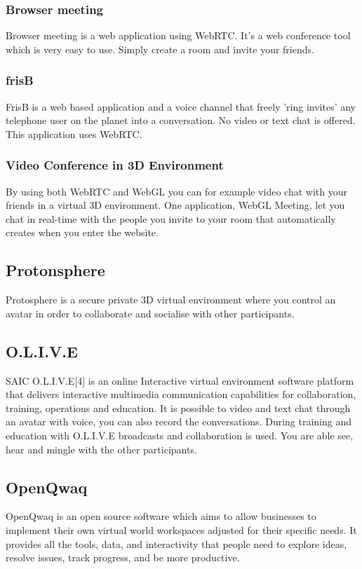 \documentclass[12pt, titlepage]{article}
\begin{document}
\subsubsection{Browser meeting}
Browser meeting\cite{12} is a web application using WebRTC. It's a web conference tool which is very easy to use. Simply create a room and invite your friends.
\subsubsection{frisB}
FrisB\cite{15} is a web based application and a voice channel that freely 'ring invites' any telephone user on the planet into a conversation. No video or text chat is offered. This application uses WebRTC.
\subsubsection{Video Conference in 3D Environment}
By using both WebRTC and WebGL you can for example video chat with your friends in a virtual 3D environment. One application, WebGL Meeting\cite{18}, let you chat in real-time with the people you invite to your room that automatically creates when you enter the website.
\subsection{Protonsphere}
Protosphere\cite{2} is a secure private 3D virtual environment where you control an avatar in order to collaborate and socialise with other participants.
\subsection{O.L.I.V.E}
SAIC O.L.I.V.E[4] is an online Interactive virtual environment software platform that delivers interactive multimedia communication capabilities for collaboration, training, operations and education. It is possible to video and text chat through an avatar with voice, you can also record the conversations. During training and education with O.L.I.V.E broadcasts and collaboration is used. You are able see, hear and mingle with the other participants.
\subsection{OpenQwaq}
OpenQwaq\cite{5} is an open source software which aims to allow businesses to implement their own virtual world workspaces adjusted for their specific needs. It provides all the tools, data, and interactivity that people need to explore ideas, resolve issues, track progress, and be more productive.
\end{document}
